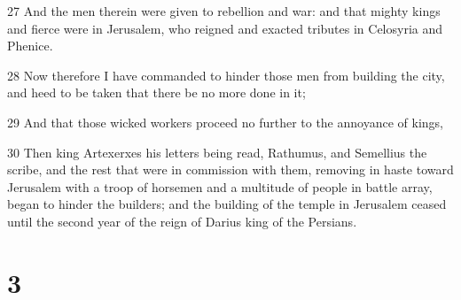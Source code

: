 \par 27 And the men therein were given to rebellion and war: and that mighty kings and fierce were in Jerusalem, who reigned and exacted tributes in Celosyria and Phenice.
\par 28 Now therefore I have commanded to hinder those men from building the city, and heed to be taken that there be no more done in it;
\par 29 And that those wicked workers proceed no further to the annoyance of kings,
\par 30 Then king Artexerxes his letters being read, Rathumus, and Semellius the scribe, and the rest that were in commission with them, removing in haste toward Jerusalem with a troop of horsemen and a multitude of people in battle array, began to hinder the builders; and the building of the temple in Jerusalem ceased until the second year of the reign of Darius king of the Persians.

\chapter{3}

